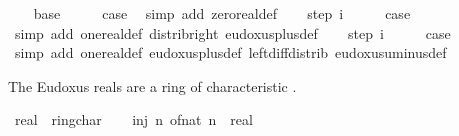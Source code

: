 \begin{isabellebody}
\ \ \isamarkupfalse%
\ base\isanewline
\ \ \isamarkupfalse%
\ \isamarkupfalse%
\ {\isacharquery}{\kern0pt}case\ \isamarkupfalse%
\ {\isacharparenleft}{\kern0pt}simp\ add{\isacharcolon}{\kern0pt}\ zero{\isacharunderscore}{\kern0pt}real{\isacharunderscore}{\kern0pt}def{\isacharparenright}{\kern0pt}\isanewline
{}\isamarkupfalse%
\isanewline
\ \ \isamarkupfalse%
\ {\isacharparenleft}{\kern0pt}step{}\ i{\isacharparenright}{\kern0pt}\isanewline
\ \ \isamarkupfalse%
\ \isamarkupfalse%
\ {\isacharquery}{\kern0pt}case\ \isamarkupfalse%
\ {\isacharparenleft}{\kern0pt}simp\ add{\isacharcolon}{\kern0pt}\ one{\isacharunderscore}{\kern0pt}real{\isacharunderscore}{\kern0pt}def\ distrib{\isacharunderscore}{\kern0pt}right\ eudoxus{\isacharunderscore}{\kern0pt}plus{\isacharunderscore}{\kern0pt}def{\isacharparenright}{\kern0pt}\isanewline
{}\isamarkupfalse%
\isanewline
\ \ \isamarkupfalse%
\ {\isacharparenleft}{\kern0pt}step{}\ i{\isacharparenright}{\kern0pt}\isanewline
\ \ \isamarkupfalse%
\ \isamarkupfalse%
\ {\isacharquery}{\kern0pt}case\ \isamarkupfalse%
\ {\isacharparenleft}{\kern0pt}simp\ add{\isacharcolon}{\kern0pt}\ one{\isacharunderscore}{\kern0pt}real{\isacharunderscore}{\kern0pt}def\ eudoxus{\isacharunderscore}{\kern0pt}plus{\isacharunderscore}{\kern0pt}def\ left{\isacharunderscore}{\kern0pt}diff{\isacharunderscore}{\kern0pt}distrib\ eudoxus{\isacharunderscore}{\kern0pt}uminus{\isacharunderscore}{\kern0pt}def{\isacharparenright}{\kern0pt}\isanewline
{}\isamarkupfalse%
%
\endisatagproof
{\isafoldproof}%
%
\isadelimproof
%
\endisadelimproof
%
\begin{isamarkuptext}%
The Eudoxus reals are a ring of characteristic .%
\end{isamarkuptext}\isamarkuptrue%
\isamarkupfalse%
\ real\ {\isacharcolon}{\kern0pt}{\isacharcolon}{\kern0pt}\ ring{\isacharunderscore}{\kern0pt}char{\isacharunderscore}{\kern0pt}{}\isanewline
%
\isadelimproof
%
\endisadelimproof
%
\isatagproof
{}\isamarkupfalse%
\isanewline
\ \ \isamarkupfalse%
\ {\isachardoublequoteopen}inj\ {\isacharparenleft}{\kern0pt}{\isasymlambda}n{\isachardot}{\kern0pt}\ of{\isacharunderscore}{\kern0pt}nat\ n\ {\isacharcolon}{\kern0pt}{\isacharcolon}{\kern0pt}\ real{\isacharparenright}{\kern0pt}{\isachardoublequoteclose}\isanewline

\end{isabellebody}
